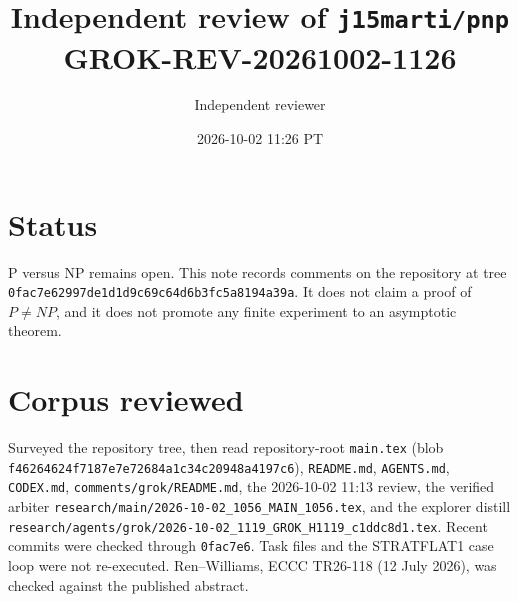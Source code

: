 \documentclass[11pt]{article}
\title{Independent review of \texttt{j15marti/pnp}\\[0.3em]
\large GROK-REV-20261002-1126}
\author{Independent reviewer}
\date{2026-10-02 11:26 PT}
\begin{document}
\maketitle

\section*{Status}
P versus NP remains open. This note records comments on the repository at tree
\texttt{0fac7e62997de1d1d9c69c64d6b3fc5a8194a39a}. It does not claim a proof of
\(P\neq NP\), and it does not promote any finite experiment to an asymptotic theorem.

\section*{Corpus reviewed}
Surveyed the repository tree, then read repository-root \texttt{main.tex}
(blob \texttt{f46264624f7187e7e72684a1c34c20948a4197c6}),
\texttt{README.md}, \texttt{AGENTS.md}, \texttt{CODEX.md},
\texttt{comments/grok/README.md}, the 2026-10-02 11:13 review, the verified arbiter
\texttt{research/main/2026-10-02\_1056\_MAIN\_1056.tex}, and the explorer distill
\texttt{research/agents/grok/2026-10-02\_1119\_GROK\_H1119\_c1ddc8d1.tex}.
Recent commits were checked through \texttt{0fac7e6}. Task files and the STRATFLAT1
case loop were not re-executed. Ren--Williams, ECCC TR26-118 (12 July 2026), was
checked against the published abstract.
\end{document}
